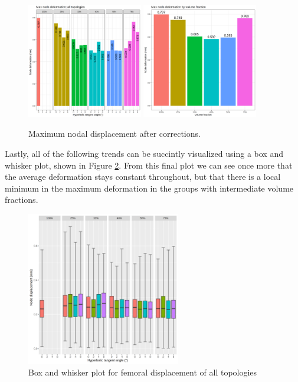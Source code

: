 \documentclass[../main.tex]{subfiles}
\begin{document}
\begin{figure}[h!]
  \includegraphics[width=0.45\textwidth]{images/results/plots/femoral/displacement/femoral_max.png}
  \hfill
  \includegraphics[width=0.45\textwidth]{images/results/plots/femoral/displacement/femoral_max_group.png}
  \caption{Maximum nodal displacement after corrections.}
  \label{fig:disp_max_correct}
\end{figure}

Lastly, all of the following trends can be succintly visualized using a box and whisker plot, shown in Figure \ref{fig:disp_boxwhisker}. From this final plot we can see once more that the average deformation stays constant throughout, but that there is a local minimum in the maximum deformation in the groups with intermediate volume fractions.

\begin{figure}[h!]
  \centering
  \includegraphics[width=0.6\textwidth]{images/results/plots/femoral/displacement/boxplots.png}
  \caption{Box and whisker plot for femoral displacement of all topologies}
  \label{fig:disp_boxwhisker}
\end{figure}
\end{document}
